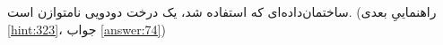 \section{}
\paragraph{}\label{hint:311}
ساختمان‌داده‌ای که استفاده شد، یک درخت دودویی نامتوازن است. (راهنماییِ بعدی \ref{hint:323}، جواب \ref{answer:74})